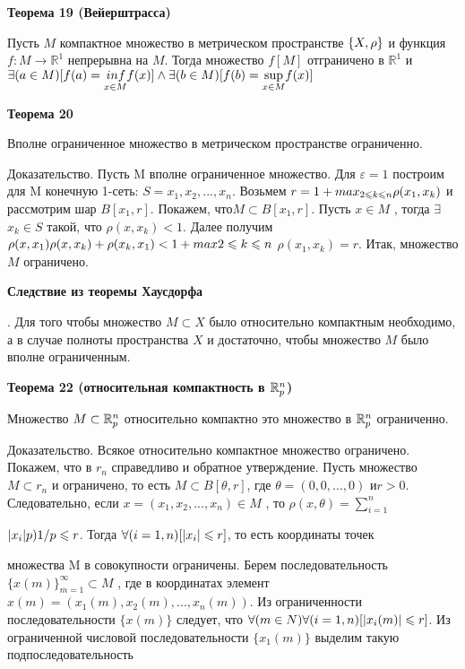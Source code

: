 {\textbf{Теорема 19 (Вейерштрасса)}

Пусть $M$ компактное множество в метрическом пространстве $\{X, \rho\}$ и функция
$f:M \rightarrow \mathbb{R}^1$ непрерывна на $M$. Тогда множество $f[M]$ отграничено в
$\mathbb{R}^1$ и $\exists(a \in M)[f(a)=\underset{x \in M}{\\inf} f(x)]\wedge
    \exists(b\in M)[f(b)=
        \underset{x \in M}{\sup} f(x)] $


\textbf{Теорема 20}

Вполне ограниченное множество в метрическом пространстве ограниченно.

Доказательство. Пусть M вполне ограниченное множество. 
Для $\varepsilon = 1$ построим для M конечную 1-сеть: $S =  {x_1, x_2, . . . , x_n}$. 
Возьмем $r  =  1 + max_{ 2\leqslant k \leqslant n} \rho(x_1, x_k)$ и рассмотрим шар $B[x_1, r].$ 
Покажем, что$ M \subset B[x_1, r]$. Пусть $x \in M$ , 
тогда $\exists$ $x_k \in S$ такой, что $\rho(x, x_k) < 1$. Далее получим
$\rho(x, x_1)	\rho(x, x_k) + \rho(x_k, x_1) < 1 +  max
2\leqslant k\leqslant n$
$\rho(x_1, x_k) = r$.
Итак, множество $M$ ограничено.


\textbf{Следствие из теоремы Хаусдорфа}

\MS. Для того чтобы множество $M \subset X$ было относительно компактным
необходимо, а в случае полноты пространства $X$ и достаточно, чтобы множество $M$
было вполне ограниченным.


\textbf{Теорема 22 (относительная компактность в $ \mathbb{R}^n_p $) }

Множество $M \subset \mathbb{R}^n_p$ относительно компактно \tttk это множество в $\mathbb{R}^n_p$
ограниченно.

Доказательство. Всякое относительно компактное множество ограничено. 
Покажем, что в $r_n$ справедливо и обратное утверждение.
Пусть множество $M  \subset r_n$  и ограничено, 
то есть $M  \subset B[\theta , r]$, где $\theta  =
(0, 0, ..., 0)$ и$ r > 0$. 
Следовательно, если $x = (x_1, x_2, ..., x_n) 
\in M$ , то $\rho(x, \theta) =\sum^n_{i=1}$

$|x_i|p)1/p  \leqslant  r$.  Тогда  $\forall(i  =  1, n)[ |x_i|  \leqslant  r ]$,  
то  есть  координаты  точек

множества M в совокупности ограничены.
Берем  последовательность  $\{x(m)\}^\infty_{m=1}   \subset  M$ ,  где  в  координатах  элемент
$x(m)  =  (x_1(m), x_2(m), ..., x_n(m))$.  Из  ограниченности  последовательности
$\{x(m)\}$ следует, что $\forall(m \in N)\forall(i = 1, n)[ |x_i(m)| \leqslant r ]$. 
Из ограниченной числовой последовательности $\{x_1(m)\}$ 
выделим такую подпоследовательность


}
